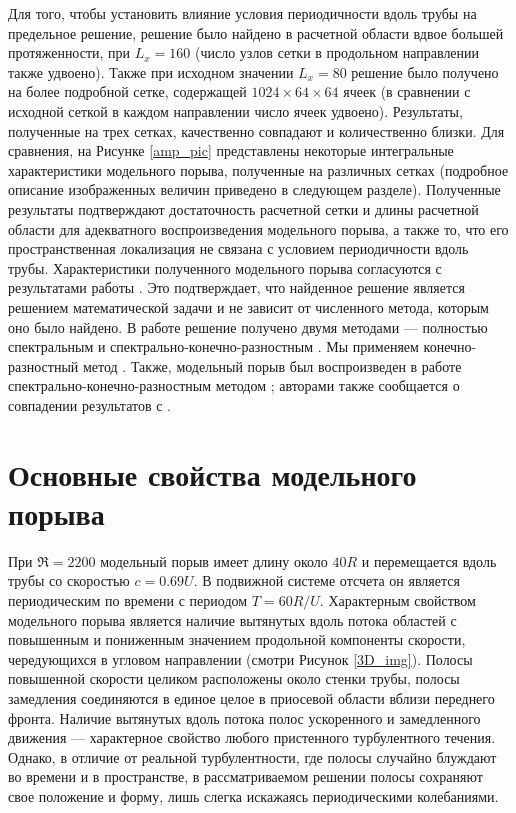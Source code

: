 Для того, чтобы установить влияние условия периодичности вдоль трубы на предельное решение, решение было найдено в расчетной области вдвое большей протяженности, при $L_x = 160$ (число узлов сетки в продольном направлении также удвоено). Также при исходном значении $L_x = 80$ решение было получено на более подробной сетке, содержащей $1024 \times 64 \times 64$ ячеек (в сравнении с исходной сеткой в каждом направлении число ячеек удвоено). Результаты, полученные на трех сетках, качественно совпадают и количественно близки. Для сравнения, на Рисунке \ref{amp_pic} представлены некоторые интегральные характеристики модельного порыва, полученные на различных сетках (подробное описание изображенных величин приведено в следующем разделе). Полученные результаты подтверждают достаточность расчетной сетки и длины расчетной области для адекватного воспроизведения модельного порыва, а также то, что его пространственная локализация не связана с условием периодичности вдоль трубы. Характеристики полученного модельного порыва согласуются с результатами работы \cite{Avila2013}. Это подтверждает, что найденное решение является решением математической задачи и не зависит от численного метода, которым оно было найдено. В работе \cite{Avila2013} решение получено двумя методами --- полностью спектральным \cite{Meseguer2007} и спектрально-конечно-разностным \cite{Willis2009}. Мы применяем конечно-разностный метод \cite{Nikitin2006}. Также, модельный порыв был воспроизведен в работе \cite{Chantry2014} спектрально-конечно-разностным методом \cite{Willis2009}; авторами также сообщается о совпадении результатов с \cite{Avila2013}. 


\section{Основные свойства модельного порыва} \label{edge_char_seq}

При $\Re=2200$ модельный порыв имеет длину около $40R$ и перемещается вдоль трубы со скоростью $c = 0.69U$. В подвижной системе отсчета он является периодическим по времени с периодом $T = 60 R/U$. Характерным свойством модельного порыва является наличие вытянутых вдоль потока областей с повышенным и пониженным значением продольной компоненты скорости, чередующихся в угловом направлении (смотри Рисунок \ref{3D_img}). Полосы повышенной скорости целиком расположены около стенки трубы, полосы замедления соединяются в единое целое в приосевой области вблизи переднего фронта. Наличие вытянутых вдоль потока полос ускоренного и замедленного движения --- характерное свойство любого пристенного турбулентного течения. Однако, в отличие от реальной турбулентности, где полосы случайно блуждают во времени и в пространстве, в рассматриваемом решении полосы сохраняют свое положение и форму, лишь слегка искажаясь периодическими колебаниями. 

